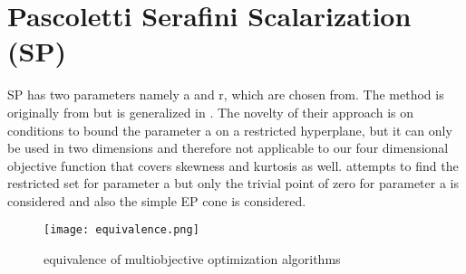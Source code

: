 \documentclass[12pt,a4paper]{article}
\numberwithin{equation}{section}
\begin{document}
\section{Pascoletti Serafini Scalarization (SP)}
SP has two parameters namely a and r, which are chosen from. The method is originally from \citep{Pascoletti1984} but is generalized in \citep{Eichfelder2008}. The novelty of their approach is  on conditions to bound the parameter a on a restricted hyperplane, but it can only be used in two dimensions and therefore not applicable to our four dimensional objective function that covers skewness and kurtosis as well.  \citep{Khorram2014} attempts to find the restricted set for parameter a but only the trivial point of zero for parameter a is considered and also the simple EP cone is considered. 
\begin{figure}
  \texttt{[image: equivalence.png]}
  \caption{equivalence of multiobjective optimization algorithms}
  \label{fig:bigPicture}
\end{figure}
\end{document}
